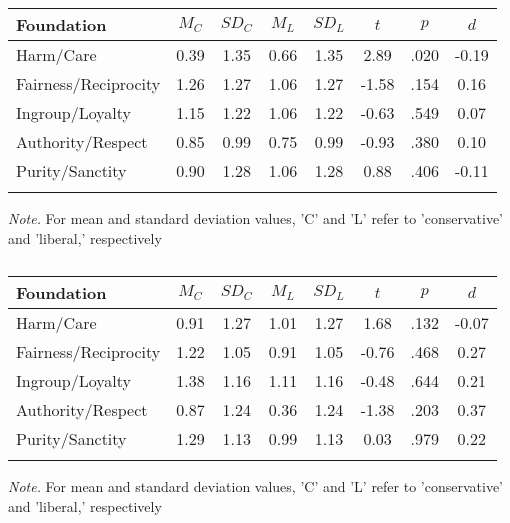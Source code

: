 \documentclass[english,,man]{apa6}
\begin{document}
\begin{table}[tbp]
\begin{center}
\begin{threeparttable}
\caption{\label{tab:exp2-tablekav}}
\begin{tabular}{lccccccc}
\toprule
Foundation & $M_C$ & $SD_C$ & $M_L$ & $SD_L$ & $t$ & $p$ & $d$\\
\midrule
Harm/Care & 0.39 & 1.35 & 0.66 & 1.35 & 2.89 & .020 & -0.19\\
Fairness/Reciprocity & 1.26 & 1.27 & 1.06 & 1.27 & -1.58 & .154 & 0.16\\
Ingroup/Loyalty & 1.15 & 1.22 & 1.06 & 1.22 & -0.63 & .549 & 0.07\\
Authority/Respect & 0.85 & 0.99 & 0.75 & 0.99 & -0.93 & .380 & 0.10\\
Purity/Sanctity & 0.90 & 1.28 & 1.06 & 1.28 & 0.88 & .406 & -0.11\\
\bottomrule
\addlinespace
\end{tabular}
\begin{tablenotes}[para]
\normalsize{\textit{Note.} For mean and standard deviation values, 'C' and 'L' refer to 'conservative' and 'liberal,' respectively}
\end{tablenotes}
\end{threeparttable}
\end{center}
\end{table}

\begin{table}[tbp]
\begin{center}
\begin{threeparttable}
\caption{\label{tab:exp2-tablegs}}
\begin{tabular}{lccccccc}
\toprule
Foundation & $M_C$ & $SD_C$ & $M_L$ & $SD_L$ & $t$ & $p$ & $d$\\
\midrule
Harm/Care & 0.91 & 1.27 & 1.01 & 1.27 & 1.68 & .132 & -0.07\\
Fairness/Reciprocity & 1.22 & 1.05 & 0.91 & 1.05 & -0.76 & .468 & 0.27\\
Ingroup/Loyalty & 1.38 & 1.16 & 1.11 & 1.16 & -0.48 & .644 & 0.21\\
Authority/Respect & 0.87 & 1.24 & 0.36 & 1.24 & -1.38 & .203 & 0.37\\
Purity/Sanctity & 1.29 & 1.13 & 0.99 & 1.13 & 0.03 & .979 & 0.22\\
\bottomrule
\addlinespace
\end{tabular}
\begin{tablenotes}[para]
\normalsize{\textit{Note.} For mean and standard deviation values, 'C' and 'L' refer to 'conservative' and 'liberal,' respectively}
\end{tablenotes}
\end{threeparttable}
\end{center}
\end{table}
\end{document}

